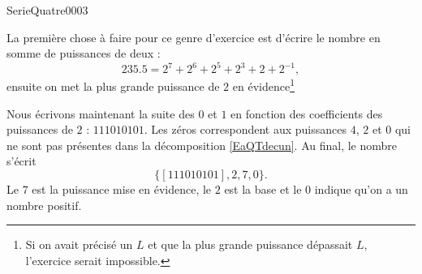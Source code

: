 
\begin{corrige}{SerieQuatre0003}

	La première chose à faire pour ce genre d'exercice est d'écrire le nombre en somme de puissances de deux :
	\begin{equation}		\label{EaQTdecun}
		235.5=2^7+2^6+2^5+2^3+2+2^{-1},
	\end{equation}
	ensuite on met la plus grande puissance de $2$ en évidence\footnote{Si on avait précisé un $L$ et que la plus grande puissance dépassait $L$, l'exercice serait impossible.}

	Nous écrivons maintenant la suite des $0$ et $1$ en fonction des coefficients des puissances de $2$ : $111010101$. Les zéros correspondent aux puissances $4$, $2$ et $0$ qui ne sont pas présentes dans la décomposition \eqref{EaQTdecun}. Au final, le nombre s'écrit
	\begin{equation}
		\{ [111010101],2,7,0 \}.
	\end{equation}
	Le $7$ est la puissance mise en évidence, le $2$ est la base et le $0$ indique qu'on a un nombre positif.

\end{corrige}
